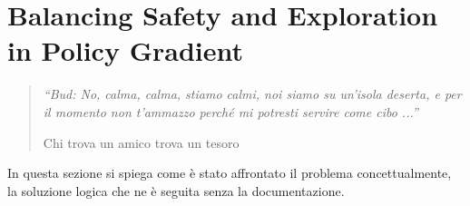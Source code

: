 \chapter{Balancing Safety and Exploration in Policy Gradient}
\label{ch:balance}
\thispagestyle{empty}

\begin{quotation}
{\footnotesize
\noindent \emph{``Bud: No, calma, calma, stiamo calmi, noi siamo su un'isola deserta, e per il momento non t'ammazzo perch\'e mi potresti servire come cibo ...''}
\begin{flushright}
Chi trova un amico trova un tesoro
\end{flushright}
}
\end{quotation}
\vspace{0.5cm}

\noindent In questa sezione si spiega come \`e stato affrontato il problema concettualmente, la soluzione logica che ne \`e seguita senza la documentazione.

